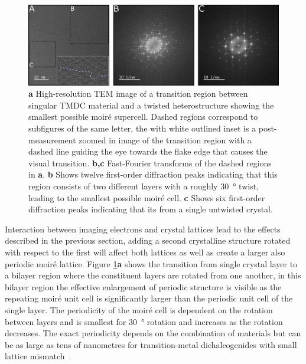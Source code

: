 \begin{figure}[h]
    \centering
    \includegraphics[width=1\linewidth, keepaspectratio]{resources/Figures/moire_transition.png}
    \caption{\textbf{a} High-resolution TEM image of a transition region between singular TMDC material and a twisted heterostructure showing the smallest possible moiré supercell. Dashed regions correspond to subfigures of the same letter, the with white outlined inset is a post-measurement zoomed in image of the transition region with a dashed line guiding the eye towards the flake edge that causes the visual transition. \textbf{b,c} Fast-Fourier transforms of the dashed regions in \textbf{a}. \textbf{b} Shows twelve first-order diffraction peaks indicating that this region consists of two different layers with a roughly \SI{30}{\degree} twist, leading to the smallest possible moiré cell. \textbf{c} Shows six first-order diffraction peaks indicating that its from a single untwisted  crystal. }
    \label{fig:moire_trans}
\end{figure}

Interaction between imaging electrons and crystal lattices lead to the effects described in the previous section, adding a second crystalline structure rotated with respect to the first will affect both lattices as well as create a larger also periodic moiré lattice.
Figure \ref{fig:moire_trans}\textbf{a} shows the transition from single crystal layer to a bilayer region where the constituent layers are rotated from one another, in this bilayer region the effective enlargement of periodic structure is visible as the repeating moiré unit cell is significantly larger than the periodic unit cell of the single layer. The periodicity of the moiré cell is dependent on the rotation between layers and is smallest for \SI{30}{\degree} rotation and increases as the rotation decreases. The exact periodicity depends on the combination of materials but can be as large as tens of nanometres for transition-metal dichalcogenides with small lattice mismatch~\cite{rosenbergerAtomicReconstructionMoire}.

